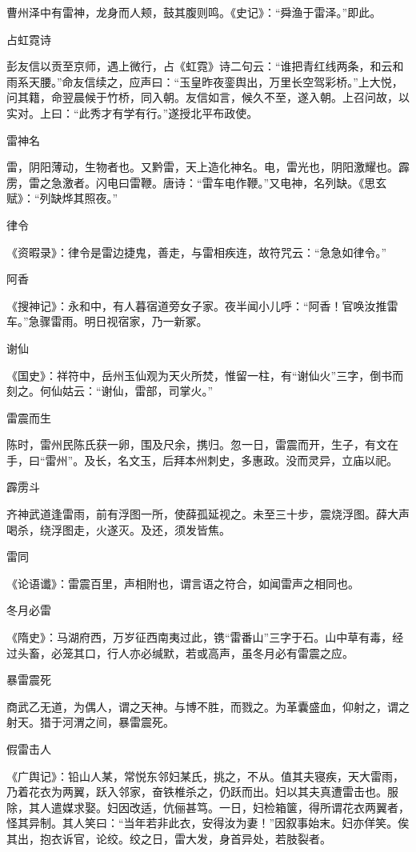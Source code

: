 \documentclass[a4paper,12pt,UTF8,twoside]{ctexbook}
\begin{document}
	曹州泽中有雷神，龙身而人颊，鼓其腹则鸣。《史记》：“舜渔于雷泽。”即此。
	
	占虹霓诗
	
	彭友信以贡至京师，遇上微行，占《虹霓》诗二句云：“谁把青红线两条，和云和雨系天腰。”命友信续之，应声曰：“玉皇昨夜銮舆出，万里长空驾彩桥。”上大悦，问其籍，命翌晨候于竹桥，同入朝。友信如言，候久不至，遂入朝。上召问故，以实对。上曰：“此秀才有学有行。”遂授北平布政使。
	
	雷神名
	
	雷，阴阳薄动，生物者也。又黔雷，天上造化神名。电，雷光也，阴阳激耀也。霹雳，雷之急激者。闪电曰雷鞭。唐诗：“雷车电作鞭。”又电神，名列缺。《思玄赋》：“列缺烨其照夜。”
	
	律令
	
	《资暇录》：律令是雷边捷鬼，善走，与雷相疾连，故符咒云：“急急如律令。”
	
	阿香
	
	《搜神记》：永和中，有人暮宿道旁女子家。夜半闻小儿呼：“阿香！官唤汝推雷车。”急骤雷雨。明日视宿家，乃一新冢。
	
	谢仙
	
	《国史》：祥符中，岳州玉仙观为天火所焚，惟留一柱，有“谢仙火”三字，倒书而刻之。何仙姑云：“谢仙，雷部，司掌火。”
	
	雷震而生
	
	陈时，雷州民陈氏获一卵，围及尺余，携归。忽一日，雷震而开，生子，有文在手，曰“雷州”。及长，名文玉，后拜本州刺史，多惠政。没而灵异，立庙以祀。
	
	霹雳斗
	
	齐神武道逢雷雨，前有浮图一所，使薛孤延视之。未至三十步，震烧浮图。薛大声喝杀，绕浮图走，火遂灭。及还，须发皆焦。
	
	雷同
	
	《论语谶》：雷震百里，声相附也，谓言语之符合，如闻雷声之相同也。
	
	冬月必雷
	
	《隋史》：马湖府西，万岁征西南夷过此，镌“雷番山”三字于石。山中草有毒，经过头畜，必笼其口，行人亦必缄默，若或高声，虽冬月必有雷震之应。
	
	暴雷震死
	
	商武乙无道，为偶人，谓之天神。与博不胜，而戮之。为革囊盛血，仰射之，谓之射天。猎于河渭之间，暴雷震死。
	
	假雷击人
	
	《广舆记》：铅山人某，常悦东邻妇某氏，挑之，不从。值其夫寝疾，天大雷雨，乃着花衣为两翼，跃入邻家，奋铁椎杀之，仍跃而出。妇以其夫真遭雷击也。服除，其人遣媒求娶。妇因改适，伉俪甚笃。一日，妇检箱箧，得所谓花衣两翼者，怪其异制。其人笑曰：“当年若非此衣，安得汝为妻！”因叙事始末。妇亦佯笑。俟其出，抱衣诉官，论绞。绞之日，雷大发，身首异处，若肢裂者。
	
\end{document}
